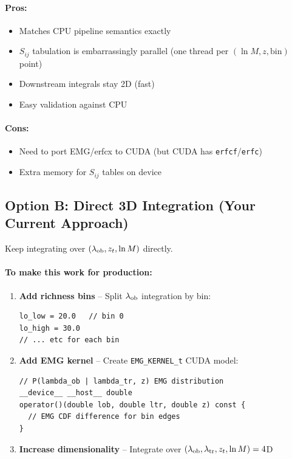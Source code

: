 \documentclass[a4paper, 11pt]{article}
\begin{document}
\paragraph{Pros:}
\begin{itemize}
  \setlength\itemsep{2pt}
  \item Matches CPU pipeline semantics exactly
  \item $S_{ij}$ tabulation is embarrassingly parallel (one thread per $(\ln M, z, \text{bin})$ point)
  \item Downstream integrals stay 2D (fast)
  \item Easy validation against CPU
\end{itemize}

\paragraph{Cons:}
\begin{itemize}
  \setlength\itemsep{2pt}
  \item Need to port EMG/erfcx to CUDA (but CUDA has \texttt{erfcf}/\texttt{erfc})
  \item Extra memory for $S_{ij}$ tables on device
\end{itemize}

\subsection{Option B: Direct 3D Integration (Your Current Approach)}

Keep integrating over $(\lambda_{\rm ob}, z_t, \ln M)$ directly.

\paragraph{To make this work for production:}

\begin{enumerate}
  \item \textbf{Add richness bins} -- Split $\lambda_{\rm ob}$ integration by bin:
\begin{lstlisting}[language=bash]
lo_low = 20.0   // bin 0
lo_high = 30.0
// ... etc for each bin
\end{lstlisting}

  \item \textbf{Add EMG kernel} -- Create \texttt{EMG\_KERNEL\_t} CUDA model:
\begin{lstlisting}
// P(lambda_ob | lambda_tr, z) EMG distribution
__device__ __host__ double
operator()(double lob, double ltr, double z) const {
  // EMG CDF difference for bin edges
}
\end{lstlisting}

  \item \textbf{Increase dimensionality} -- Integrate over $(\lambda_{\rm ob}, \lambda_{\rm tr}, z_t, \ln M) = 4$D
\end{enumerate}
\end{document}
